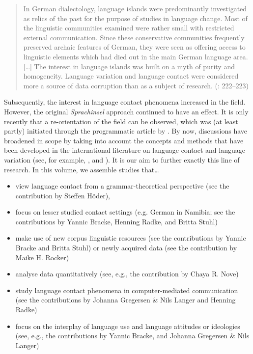 \documentclass[output=paper]{langsci/langscibook}
\begin{document}
\begin{quote}
In German dialectology, language islands were predominantly investigated as relics of the past for the purpose of studies in language change. Most of the linguistic communities examined were rather small with restricted external communication. Since these conservative communities frequently preserved archaic features of German, they were seen as offering access to linguistic elements which had died out in the main German language area. […] The interest in language islands was built on a myth of purity and homogeneity. Language variation and language contact were considered more a source of data corruption than as a subject of research. (\citealt{Rosenberg2005}: 222–223)
\end{quote}

     Subsequently, the interest in language contact phenomena increased in the field. However, the original \textit{Sprachinsel} approach continued to have an effect. It is only recently that a re-orientation of the field can be observed, which was (at least partly) initiated through the programmatic article by \citet{mattheier_theorie_1994}. By now, discussions have broadened in scope by taking into account the concepts and methods that have been developed in the international literature on language contact and language variation (see, for example, \citealt{putnam_studies_2011}, \citealt{page_moribund_2015} and \citealt{boas_constructions_2018}). It is our aim to further exactly this line of research. In this volume, we assemble studies that…\\
\begin{itemize}
\item 
view language contact from a grammar-theoretical perspective (see the contribution by Steffen Höder),

\item 
focus on lesser studied contact settings (e.g. German in Namibia; see the contributions by Yannic Bracke, Henning Radke, and Britta Stuhl) 

\item 
make use of new corpus linguistic resources (see the contributions by Yannic Bracke and Britta Stuhl) or newly acquired data (see the contribution by Maike H. Rocker)

\item 
analyse data quantitatively (see, e.g., the contribution by Chaya R. Nove)

\item 
study language contact phenomena in computer-mediated communication (see the contributions by Johanna Gregersen \& Nils Langer and Henning Radke)

\item 
focus on the interplay of language use and language attitudes or ideologies (see, e.g., the contributions by Yannic Bracke, and Johanna Gregersen \& Nils Langer)
\end{itemize}
\end{document}
